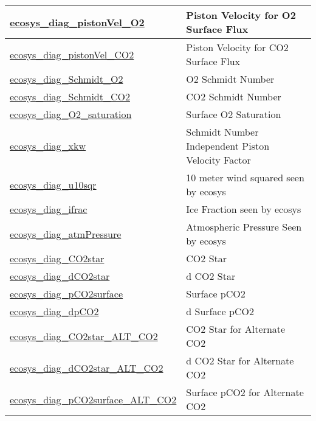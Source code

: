 {\begin{center}
\begin{longtable}{| p{2.0in} | p{4.0in} |}
    \hline
    \hyperref[subsec:var_sec_forcing_ecosys_diag_pistonVel_O2]{ecosys\_diag\_pistonVel\_O2} & Piston Velocity for O2 Surface Flux \\
    \hline
    \hyperref[subsec:var_sec_forcing_ecosys_diag_pistonVel_CO2]{ecosys\_diag\_pistonVel\_CO2} & Piston Velocity for CO2 Surface Flux \\
    \hline
    \hyperref[subsec:var_sec_forcing_ecosys_diag_Schmidt_O2]{ecosys\_diag\_Schmidt\_O2} & O2 Schmidt Number \\
    \hline
    \hyperref[subsec:var_sec_forcing_ecosys_diag_Schmidt_CO2]{ecosys\_diag\_Schmidt\_CO2} & CO2 Schmidt Number \\
    \hline
    \hyperref[subsec:var_sec_forcing_ecosys_diag_O2_saturation]{ecosys\_diag\_O2\_saturation} & Surface O2 Saturation \\
    \hline
    \hyperref[subsec:var_sec_forcing_ecosys_diag_xkw]{ecosys\_diag\_xkw} & Schmidt Number Independent Piston Velocity Factor \\
    \hline
    \hyperref[subsec:var_sec_forcing_ecosys_diag_u10sqr]{ecosys\_diag\_u10sqr} & 10 meter wind squared seen by ecosys \\
    \hline
    \hyperref[subsec:var_sec_forcing_ecosys_diag_ifrac]{ecosys\_diag\_ifrac} & Ice Fraction seen by ecosys \\
    \hline
    \hyperref[subsec:var_sec_forcing_ecosys_diag_atmPressure]{ecosys\_diag\_atmPressure} & Atmospheric Pressure Seen by ecosys \\
    \hline
    \hyperref[subsec:var_sec_forcing_ecosys_diag_CO2star]{ecosys\_diag\_CO2star} & CO2 Star \\
    \hline
    \hyperref[subsec:var_sec_forcing_ecosys_diag_dCO2star]{ecosys\_diag\_dCO2star} & d CO2 Star \\
    \hline
    \hyperref[subsec:var_sec_forcing_ecosys_diag_pCO2surface]{ecosys\_diag\_pCO2surface} & Surface pCO2 \\
    \hline
    \hyperref[subsec:var_sec_forcing_ecosys_diag_dpCO2]{ecosys\_diag\_dpCO2} & d Surface pCO2 \\
    \hline
    \hyperref[subsec:var_sec_forcing_ecosys_diag_CO2star_ALT_CO2]{ecosys\_diag\_CO2star\_ALT\_\-CO2} & CO2 Star for Alternate CO2 \\
    \hline
    \hyperref[subsec:var_sec_forcing_ecosys_diag_dCO2star_ALT_CO2]{ecosys\_diag\_dCO2star\_ALT\_\-CO2} & d CO2 Star for Alternate CO2 \\
    \hline
    \hyperref[subsec:var_sec_forcing_ecosys_diag_pCO2surface_ALT_CO2]{ecosys\_diag\_pCO2surface\_\-ALT\_CO2} & Surface pCO2 for Alternate CO2 \\

\end{longtable}
\end{center}}
